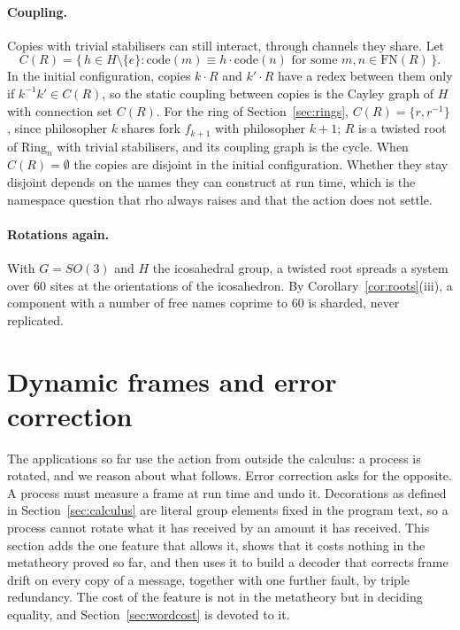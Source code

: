 \documentclass[11pt]{article}
\theoremstyle{definition}
\theoremstyle{remark}
\newcommand{\act}[2]{#1\cdot #2}
\newcommand{\scong}{\equiv}
\newcommand{\FN}{\mathrm{FN}}
\newcommand{\code}{\mathrm{code}}
\newcommand{\ring}{\mathrm{Ring}}
\begin{document}
\paragraph{Coupling.}
Copies with trivial stabilisers can still interact, through channels they
share. Let
\[
C(R)=\{\,h\in H\setminus\{e\} : \code(m)\scong\act{h}{\code(n)}
\text{ for some } m,n\in\FN(R)\,\}.
\]
In the initial configuration, copies $\act{k}{R}$ and $\act{k'}{R}$ have a
redex between them only if $k^{-1}k'\in C(R)$, so the static coupling between
copies is the Cayley graph of $H$ with connection set $C(R)$. For the ring of
Section~\ref{sec:rings}, $C(R)=\{r,r^{-1}\}$, since philosopher $k$ shares fork
$f_{k+1}$ with philosopher $k+1$; $R$ is a twisted root of $\ring_n$ with trivial
stabilisers, and its coupling graph is the cycle. When $C(R)=\emptyset$
the copies are disjoint in the initial configuration. Whether they stay
disjoint depends on the names they can construct at run time, which is the
namespace question that rho always raises and that the action does not settle.

\paragraph{Rotations again.}
With $G=SO(3)$ and $H$ the icosahedral group, a twisted root spreads a system
over $60$ sites at the orientations of the icosahedron. By
Corollary~\ref{cor:roots}(iii), a component with a number of free names
coprime to $60$ is sharded, never replicated.

\section{Dynamic frames and error correction}\label{sec:ecc}

The applications so far use the action from outside the calculus: a
process is rotated, and we reason about what follows. Error correction asks
for the opposite. A process must measure a frame at run time and undo it.
Decorations as defined in Section~\ref{sec:calculus} are literal group
elements fixed in the program text, so a process cannot rotate what it has
received by an amount it has received. This section adds the one feature that
allows it, shows that it costs nothing in the metatheory proved so far, and
then uses it to build a decoder that corrects frame drift on every copy of a
message, together with one further fault, by triple redundancy. The cost of
the feature is not in the metatheory but in deciding equality, and
Section~\ref{sec:wordcost} is devoted to it.
\end{document}
